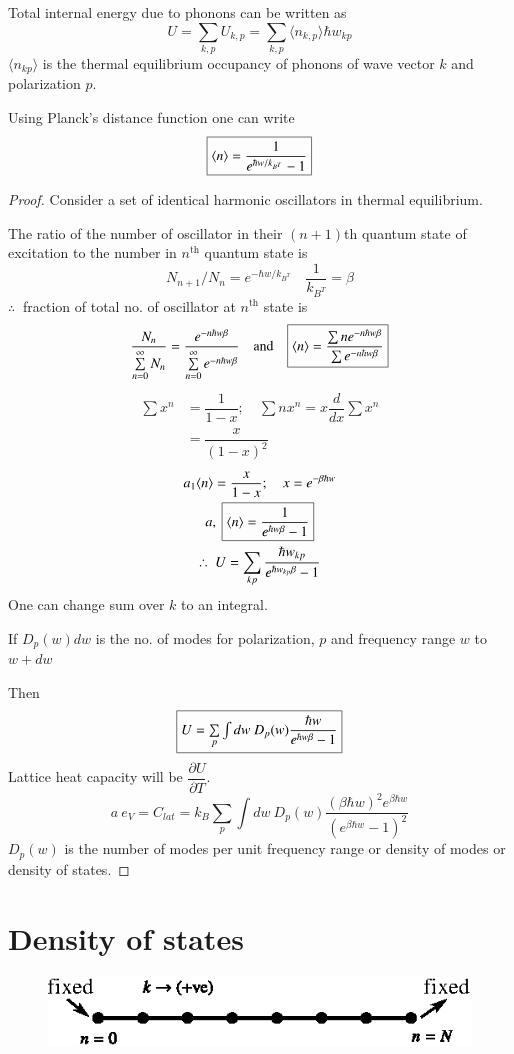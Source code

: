 Total internal energy due to phonons can be written as
$$
U=\sum\limits_{k,p}U_{k,p}=\sum\limits_{k,p}\langle n_{k,p}\rangle \hbar w_{kp}
$$
$\langle n_{kp}\rangle$ is the thermal equilibrium occupancy of phonons of wave vector $k$ and polarization $p$.

Using Planck's distance function one can write
$$
\fbox{$\langle n\rangle = \dfrac{1}{e^{\hbar w/k_{B^{T}}}-1}$}
$$

\begin{proof}
Consider a set of identical harmonic oscillators in thermal equilibrium.

The ratio of the number of oscillator in their $(n+1)$th quantum state of excitation to the number in $n^{\text{th}}$ quantum state is
$$
N_{n+1}/N_{n}=e^{-\hbar w/k_{B^{T}}}\quad \dfrac{1}{k_{B^{T}}}=\beta
$$
$\therefore \ $ fraction of total no. of oscillator at $n^{\text{th}}$ state is
$$
\dfrac{N_{n}}{\sum\limits^{\infty}_{n=0}N_{n}}=\dfrac{e^{-n\hbar w\beta}}{\sum\limits^{\infty}_{n=0}e^{-n\hbar w\beta}}\quad\text{and}\quad 
\fbox{$\langle n\rangle = \dfrac{\sum ne^{-n\hbar w\beta}}{\sum e^{-n\hbar w\beta}}$}
$$
\begin{align*}
\sum x^{n}&=\dfrac{1}{1-x};\quad \sum nx^{n}=x\dfrac{d}{dx}\sum x^{n}\\
&= \dfrac{x}{(1-x)^{2}}
\end{align*}
\begin{gather*}
a_{1}\langle n\rangle =\dfrac{x}{1-x};\quad x=e^{-\beta \hbar w}\\
a, \ \fbox{$\langle n\rangle = \dfrac{1}{e^{\hbar w\beta}-1}$}\\
\therefore \ U = \sum\limits_{kp}\dfrac{\hbar w_{kp}}{e^{\hbar w_{kp}\beta}-1}
\end{gather*}
One can change sum over $k$ to an integral.

If $D_{p}(w)dw$ is the no. of modes for polarization, $p$ and frequency range $w$ to $w+dw$

Then
$$
\fbox{$U=\sum\limits_{p}\int dw \ D_{p}(w)\dfrac{\hbar w}{e^{\hbar w\beta}-1}$}
$$
Lattice heat capacity will be $\dfrac{\partial U}{\partial T}$.
$$
a \ e_{V}=C_{lat}=k_{B}\sum\limits_{p}\int dw \ D_{p}(w)\dfrac{(\beta \hbar w)^{2}e^{\beta\hbar w}}{\left(e^{\beta \hbar w}-1\right)^{2}}
$$
$D_{p}(w)$ is the number of modes per unit frequency range or density of modes or density of states.
\end{proof}

\section*{Density of states}
\begin{figure}[H]
\centering
\includegraphics[scale=1.2]{images/lecture19/fig2a.eps}
\end{figure}

